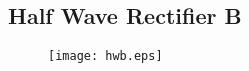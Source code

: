 \subsection{Half Wave Rectifier B}
\begin{figure}[H]
  \begin{center}
    \texttt{[image: hwb.eps]}
\end{center}
\end{figure}